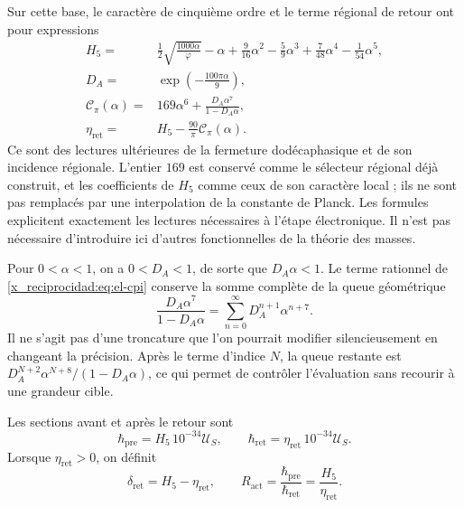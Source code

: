 Sur cette base, le caractère de cinquième ordre et le terme régional de
retour ont pour expressions
\begin{align}
 H_5={}&\frac12\sqrt{\frac{1000\alpha}{\varphi}}-\alpha
   +\frac9{16}\alpha^2-\frac59\alpha^3
   +\frac7{48}\alpha^4-\frac1{54}\alpha^5,
   \label{x_reciprocidad:eq:el-h5}\\
 D_A={}&\exp\!\left(-\frac{100\pi\alpha}{9}\right),
   \label{x_reciprocidad:eq:el-da}\\
 \mathcal C_\pi(\alpha)={}&169\alpha^6+
       \frac{D_A\alpha^7}{1-D_A\alpha},
   \label{x_reciprocidad:eq:el-cpi}\\
 \eta_{\mathrm{ret}}={}&H_5-\frac{90}{\pi}\mathcal C_\pi(\alpha).
   \label{x_reciprocidad:eq:el-eta}
\end{align}
Ce sont des lectures ultérieures de la fermeture dodécaphasique et de son
incidence régionale. L'entier \(169\) est conservé comme le sélecteur
régional déjà construit, et les coefficients de \(H_5\) comme ceux de son
caractère local ; ils ne sont pas remplacés par une interpolation de la constante de
Planck. Les formules explicitent exactement les lectures nécessaires
à l'étape électronique. Il n'est pas nécessaire d'introduire ici d'autres
fonctionnelles de la théorie des masses.

Pour \(0<\alpha<1\), on a \(0<D_A<1\), de sorte que
\(D_A\alpha<1\). Le terme rationnel de \eqref{x_reciprocidad:eq:el-cpi} conserve la
somme complète de la queue géométrique
\begin{equation}
 \frac{D_A\alpha^7}{1-D_A\alpha}
 =\sum_{n=0}^{\infty}D_A^{n+1}\alpha^{n+7}.
 \label{x_reciprocidad:eq:el-cola-regional}
\end{equation}
Il ne s'agit pas d'une troncature que l'on pourrait modifier silencieusement en changeant la
précision. Après le terme d'indice \(N\), la queue restante est
\(D_A^{N+2}\alpha^{N+8}/(1-D_A\alpha)\), ce qui permet de contrôler
l'évaluation sans recourir à une grandeur cible.

\begin{definition}
Les sections avant et après le retour sont
\begin{equation}
 \hbar_{\mathrm{pre}}=H_5\,10^{-34}\mathcal U_S,
 \qquad
 \hbar_{\mathrm{ret}}=\eta_{\mathrm{ret}}\,10^{-34}\mathcal U_S.
 \label{x_reciprocidad:eq:el-secciones-accion}
\end{equation}
Lorsque \(\eta_{\mathrm{ret}}>0\), on définit
\begin{equation}
 \delta_{\mathrm{ret}}=H_5-\eta_{\mathrm{ret}},\qquad
 R_{\mathrm{act}}=\frac{\hbar_{\mathrm{pre}}}{\hbar_{\mathrm{ret}}}
 =\frac{H_5}{\eta_{\mathrm{ret}}}.
 \label{x_reciprocidad:eq:el-ratio}
\end{equation}
\end{definition}

